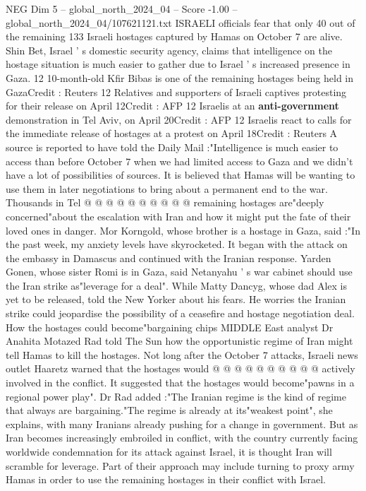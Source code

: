 \begin{textsample}{NEG Dim 5 – global\_north\_2024\_04 – Score -1.00 – global\_north\_2024\_04/107621121.txt}  \label{ex:f5_neg_163}
ISRAELI officials fear that only 40 out of the remaining 133 Israeli hostages captured by Hamas on October 7 are alive.
Shin Bet, Israel ' s domestic security agency, claims that intelligence on the hostage situation is much easier to gather due to Israel ' s increased presence in Gaza. 12 10-month-old Kfir Bibas is one of the remaining hostages being held in GazaCredit : Reuters 12 Relatives and supporters of Israeli captives protesting for their release on April 12Credit : AFP 12 Israelis at an \textbf{anti-government} demonstration in Tel Aviv, on April 20Credit : AFP 12 Israelis react to calls for the immediate release of hostages at a protest on April 18Credit : Reuters A source is reported to have told the Daily Mail :"Intelligence is much easier to access than before October 7 when we had limited access to Gaza and we didn't have a lot of possibilities of sources.
It is believed that Hamas will be wanting to use them in later negotiations to bring about a permanent end to the war.
Thousands in Tel @ @ @ @ @ @ @ @ @ @ remaining hostages are"deeply concerned"about the escalation with Iran and how it might put the fate of their loved ones in danger.
Mor Korngold, whose brother is a hostage in Gaza, said :"In the past week, my anxiety levels have skyrocketed.
It began with the attack on the embassy in Damascus and continued with the Iranian response.
Yarden Gonen, whose sister Romi is in Gaza, said Netanyahu ' s war cabinet should use the Iran strike as"leverage for a deal".
While Matty Dancyg, whose dad Alex is yet to be released, told the New Yorker about his fears.
He worries the Iranian strike could jeopardise the possibility of a ceasefire and hostage negotiation deal.
How the hostages could become"bargaining chips MIDDLE East analyst Dr Anahita Motazed Rad told The Sun how the opportunistic regime of Iran might tell Hamas to kill the hostages.
Not long after the October 7 attacks, Israeli news outlet Haaretz warned that the hostages would @ @ @ @ @ @ @ @ @ @ actively involved in the conflict.
It suggested that the hostages would become"pawns in a regional power play".
Dr Rad added :"The Iranian regime is the kind of regime that always are bargaining."The regime is already at its"weakest point", she explains, with many Iranians already pushing for a change in government.
But as Iran becomes increasingly embroiled in conflict, with the country currently facing worldwide condemnation for its attack against Israel, it is thought Iran will scramble for leverage.
Part of their approach may include turning to proxy army Hamas in order to use the remaining hostages in their conflict with Israel.

\end{textsample}
